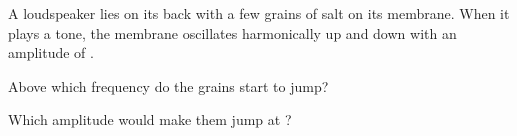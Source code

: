 A loudspeaker lies on its back with a few grains of salt on its membrane. When it plays a tone, the membrane oscillates harmonically up and down with an amplitude of \AO.

\begin{abcliste}
\abc
Above which frequency do the grains start to jump?

\abc
Which amplitude would make them jump at \fbO?
\end{abcliste}
